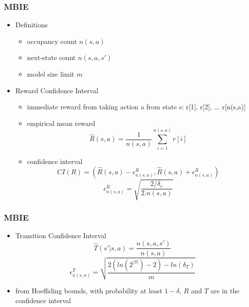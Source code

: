 \documentclass{beamer}
\begin{document}

\begin{frame}
	\frametitle{MBIE}
	\begin{itemize}
		\item Definitions
		\begin{itemize}
			\item occupancy count $n(s,a)$
			\item next-state count $n(s,a,s')$
			\item model size limit $m$
		\end{itemize}
		\item Reward Confidence Interval
		\begin{itemize}
			\item immediate reward from taking action a from state s: \newline r[1], r[2], ... r[n(s,a)]
			\item empirical mean reward
			$$ \hat{R}(s,a) = \frac{1}{n(s,a)} \sum_{i=1}^{n(s,a)} r[i] $$
			\item confidence interval
			$$ CI(R) = (\hat{R}(s,a)-\epsilon_{n(s,a)}^R , \hat{R}(s,a)+\epsilon_{n(s,a)}^R) $$
			$$ \epsilon_{n(s,a)}^R = \sqrt{\frac{2/\delta_r}{2.n(s,a)}} $$
		
		\end{itemize}
	\end{itemize}
\end{frame}

\begin{frame}
	\frametitle{MBIE}
	\begin{itemize}
		\item Transition Confidence Interval
		$$ \hat{T}(s'|s,a) = \frac{n(s,a,s')}{n(s,a)} $$
		$$ \epsilon_{n(s,a)}^T = \sqrt{\frac{2(ln(2^{|S|}) - 2) - ln(\delta_T)}{m}} $$
		\item from Hoeffiding bounds, with probability at least $1-\delta$, $R$ and $T$ are in the confidence interval
	\end{itemize}
\end{frame}
\end{document}
